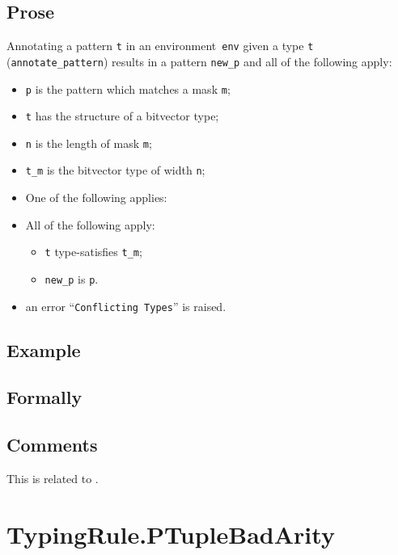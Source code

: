 \documentclass{book}
\begin{document}
\begin{itemize}
  \subsection{Prose}
   Annotating a pattern \texttt{t} in an environment~\texttt{env} given a type \texttt{t} (\texttt{annotate\_pattern}) results in a pattern \texttt{new\_p} and all of the following apply:
   \begin{itemize}
   \item \texttt{p} is the pattern which matches a mask \texttt{m};
   \item \texttt{t} has the structure of a bitvector type;
   \item \texttt{n} is the length of mask \texttt{m};
   \item \texttt{t\_m} is the bitvector type of width \texttt{n};
   \item One of the following applies:
     \item All of the following apply:
       \begin{itemize}
       \item \texttt{t} type-satisfies \texttt{t\_m};
       \item \texttt{new\_p} is \texttt{p}.
       \end{itemize}
     \item an error ``\texttt{Conflicting Types}'' is raised.
   \end{itemize}

  \subsection{Example}



\begin{emptyformal}
    \subsection{Formally}
\end{emptyformal}

\subsection{Comments}
  This is related to .

\section{TypingRule.PTupleBadArity \label{sec:TypingRule.PTupleBadArity}}


\end{itemize}
\end{document}
